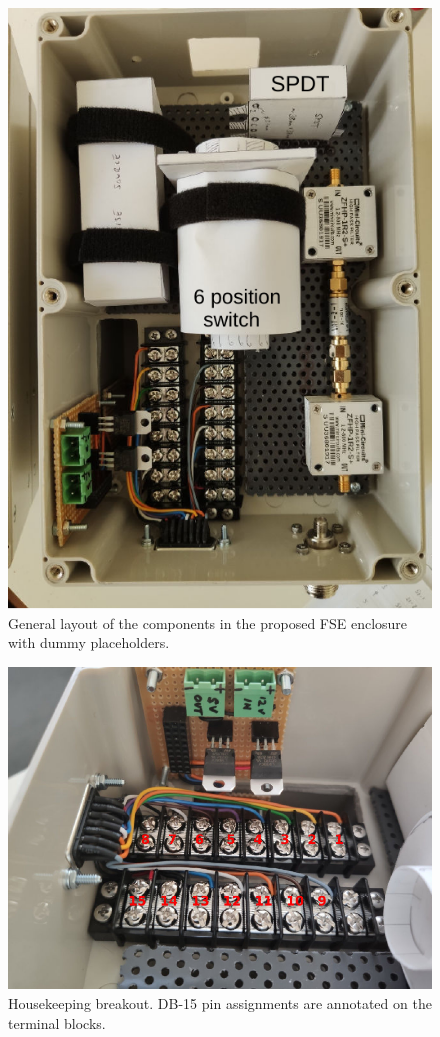 \begin{figure}
	\centering
	\includegraphics[width=0.5\linewidth]{Figures/FSE_archi}
	\caption{General layout of the components in the proposed FSE enclosure with dummy placeholders.}
	\label{Fig:FSE_archi}
\end{figure}

\begin{figure}
	\centering
	\includegraphics[width=0.7\linewidth]{Figures/Terminal}
	\caption{Housekeeping breakout. DB-15 pin assignments are annotated on the terminal blocks.}
	\label{Fig:Terminal}
\end{figure}

